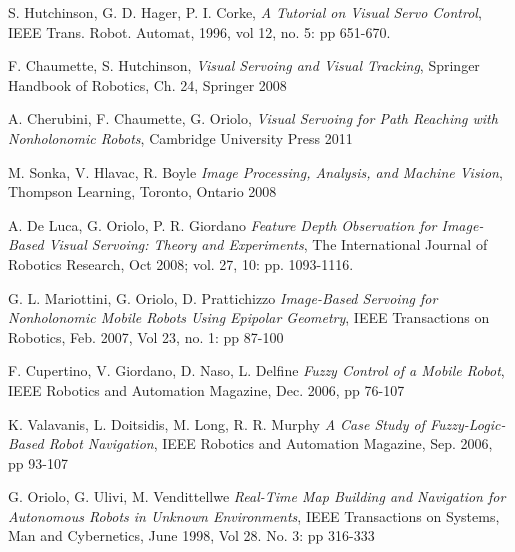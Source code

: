\documentclass[12pt]{article}
\begin{document}
\newpage

\begin{thebibliography}{1}
	S. Hutchinson, G. D. Hager, P. I. Corke,  \emph{A Tutorial on Visual Servo Control}, IEEE Trans. Robot. Automat, 1996, vol 12, no. 5: pp 651-670.

	F. Chaumette, S. Hutchinson, \emph{Visual Servoing and Visual Tracking}, Springer Handbook of Robotics, Ch. 24, Springer 2008

	A. Cherubini, F. Chaumette, G. Oriolo, \emph{Visual Servoing for Path Reaching with Nonholonomic Robots}, Cambridge University Press 2011

	M. Sonka, V. Hlavac, R. Boyle \emph{Image Processing, Analysis, and Machine Vision}, Thompson Learning, Toronto, Ontario 2008

	A. De Luca, G. Oriolo, P. R. Giordano \emph{Feature Depth Observation for Image-Based Visual Servoing: Theory and Experiments}, The International Journal of Robotics Research, Oct 2008; vol. 27, 10: pp. 1093-1116.

	G. L. Mariottini, G. Oriolo, D. Prattichizzo \emph{Image-Based Servoing for Nonholonomic Mobile Robots Using Epipolar Geometry}, IEEE Transactions on Robotics, Feb. 2007, Vol 23, no. 1: pp 87-100

	F. Cupertino, V. Giordano, D. Naso, L. Delfine \emph{Fuzzy Control of a Mobile Robot}, IEEE Robotics and Automation Magazine, Dec. 2006, pp 76-107

	K. Valavanis, L. Doitsidis, M. Long, R. R. Murphy \emph{A Case Study of Fuzzy-Logic-Based Robot Navigation}, IEEE Robotics and Automation Magazine, Sep. 2006, pp 93-107

	G. Oriolo, G. Ulivi, M. Vendittellwe \emph{Real-Time Map Building and Navigation for Autonomous Robots in Unknown Environments}, IEEE Transactions on Systems, Man and Cybernetics, June 1998, Vol 28. No. 3: pp 316-333

\end{thebibliography}

\newpage
\end{document}
